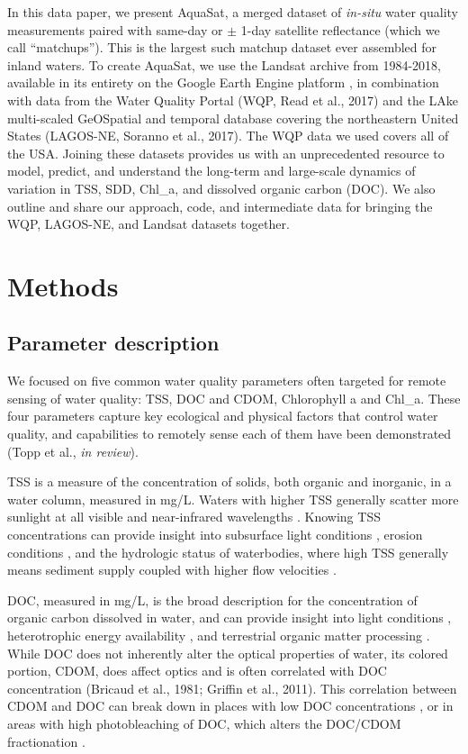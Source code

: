 \documentclass[]{agujournal2018}
\begin{document}
In this data paper, we present AquaSat, a merged dataset of
\emph{in-situ} water quality measurements paired with same-day or
\(\pm\) 1-day satellite reflectance (which we call ``matchups''). This
is the largest such matchup dataset ever assembled for inland waters. To
create AquaSat, we use the Landsat archive from 1984-2018, available in
its entirety on the Google Earth Engine platform \citep{Gorelick2017},
in combination with data from the Water Quality Portal (WQP, Read et
al., 2017) and the LAke multi-scaled GeOSpatial and temporal database
covering the northeastern United States (LAGOS-NE, Soranno et al.,
2017). The WQP data we used covers all of the USA. Joining these
datasets provides us with an unprecedented resource to model, predict,
and understand the long-term and large-scale dynamics of variation in
TSS, SDD, Chl\_a, and dissolved organic carbon (DOC). We also outline
and share our approach, code, and intermediate data for bringing the
WQP, LAGOS-NE, and Landsat datasets together.

\section{Methods}

\subsection{Parameter description}

We focused on five common water quality parameters often targeted for
remote sensing of water quality: TSS, DOC and CDOM, Chlorophyll a and
Chl\_a. These four parameters capture key ecological and physical
factors that control water quality, and capabilities to remotely sense
each of them have been demonstrated (Topp et al., \emph{in review}).

TSS is a measure of the concentration of solids, both organic and
inorganic, in a water column, measured in mg/L. Waters with higher TSS
generally scatter more sunlight at all visible and near-infrared
wavelengths \citep{Ritchie1976}. Knowing TSS concentrations can provide
insight into subsurface light conditions \citep{Julian2008}, erosion
conditions \citep{Syvitski2011}, and the hydrologic status of
waterbodies, where high TSS generally means sediment supply coupled with
higher flow velocities \citep{Williams1989,Pavelsky2009}.

DOC, measured in mg/L, is the broad description for the concentration of
organic carbon dissolved in water, and can provide insight into light
conditions \citep{Vahatalo2005}, heterotrophic energy availability
\citep{Robbins2017}, and terrestrial organic matter processing
\citep{Williamson2008}. While DOC does not inherently alter the optical
properties of water, its colored portion, CDOM, does affect optics and
is often correlated with DOC concentration
\citep{Bricaud1981,Griffin2011} (Bricaud et al., 1981; Griffin et al.,
2011). This correlation between CDOM and DOC can break down in places
with low DOC concentrations \citep{Griffin2018}, or in areas with high
photobleaching of DOC, which alters the DOC/CDOM fractionation
\citep{Spencer2009,Cory2015}.
\end{document}
